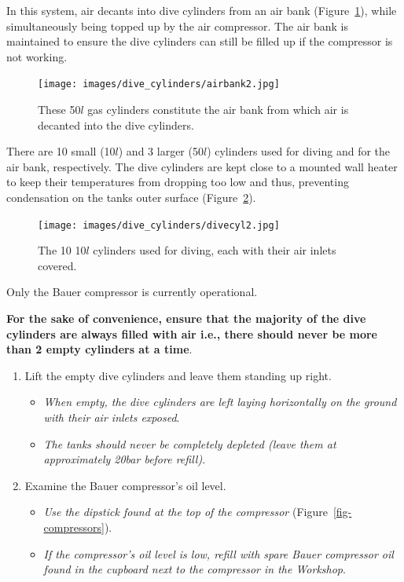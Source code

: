 \documentclass[
  12pt,
]{report}
\providecommand{\tightlist}{%
  \setlength{\itemsep}{0pt}\setlength{\parskip}{0pt}}\usepackage{longtable,booktabs,array}
\begin{document}
In this system, air decants into dive cylinders from an air bank
(Figure~\ref{fig-airbank}), while simultaneously being topped up by the
air compressor. The air bank is maintained to ensure the dive cylinders
can still be filled up if the compressor is not working.

\begin{figure}[H]

{\centering \texttt{[image: images/dive\_cylinders/airbank2.jpg]}

}

\caption{\label{fig-airbank}These 50\(l\) gas cylinders constitute the
air bank from which air is decanted into the dive cylinders.}

\end{figure}

There are 10 small (10\(l\)) and 3 larger (50\(l\)) cylinders used for
diving and for the air bank, respectively. The dive cylinders are kept
close to a mounted wall heater to keep their temperatures from dropping
too low and thus, preventing condensation on the tanks outer surface
(Figure~\ref{fig-divecyl}).

\begin{figure}[H]

{\centering \texttt{[image: images/dive\_cylinders/divecyl2.jpg]}

}

\caption{\label{fig-divecyl}The 10 10\(l\) cylinders used for diving,
each with their air inlets covered.}

\end{figure}

{Only the Bauer compressor is currently operational}.

\textbf{For the sake of convenience, ensure that the majority of the
dive cylinders are always filled with air i.e., there should never be
more than 2 empty cylinders at a time}.

\begin{enumerate}
\def\labelenumi{\arabic{enumi}.}
\tightlist
\item
  Lift the empty dive cylinders and leave them standing up right.

  \begin{itemize}
  \tightlist
  \item
    \emph{When empty, the dive cylinders are left laying horizontally on
    the ground with their air inlets exposed}.
  \item
    \emph{The tanks should never be completely depleted (leave them at
    approximately 20bar before refill)}.
  \end{itemize}
\item
  Examine the Bauer compressor's oil level.

  \begin{itemize}
  \tightlist
  \item
    \emph{Use the dipstick found at the top of the compressor}
    (Figure~\ref{fig-compressors}).
  \item
    \emph{If the compressor's oil level is low, refill with spare Bauer
    compressor oil found in the cupboard next to the compressor in the
    Workshop}.
  \end{itemize}
\end{enumerate}
\end{document}

